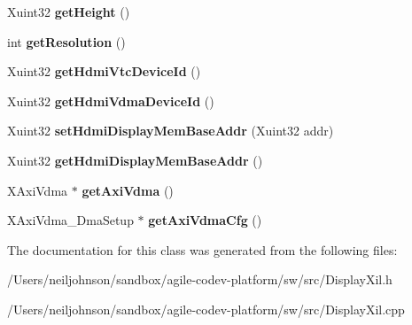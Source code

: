 \begin{DoxyCompactItemize}
\item 
\hypertarget{class_display_xil_affa3b96c0ab1cacc7be57894d23ee775}{Xuint32 {\bfseries get\+Height} ()}\label{class_display_xil_affa3b96c0ab1cacc7be57894d23ee775}

\item 
\hypertarget{class_display_xil_a2b2d3013803ffa0b2516b9e5def7080c}{int {\bfseries get\+Resolution} ()}\label{class_display_xil_a2b2d3013803ffa0b2516b9e5def7080c}

\item 
\hypertarget{class_display_xil_ac2e2d2e53c6845c94826d66609051e4e}{Xuint32 {\bfseries get\+Hdmi\+Vtc\+Device\+Id} ()}\label{class_display_xil_ac2e2d2e53c6845c94826d66609051e4e}

\item 
\hypertarget{class_display_xil_a91b8aeef0fdc4d6e14f431851fe4d7d6}{Xuint32 {\bfseries get\+Hdmi\+Vdma\+Device\+Id} ()}\label{class_display_xil_a91b8aeef0fdc4d6e14f431851fe4d7d6}

\item 
\hypertarget{class_display_xil_ab693f7986ccb1086fde71d2fb96922a7}{Xuint32 {\bfseries set\+Hdmi\+Display\+Mem\+Base\+Addr} (Xuint32 addr)}\label{class_display_xil_ab693f7986ccb1086fde71d2fb96922a7}

\item 
\hypertarget{class_display_xil_ab760adbb64268a15b5988e1b62c5f424}{Xuint32 {\bfseries get\+Hdmi\+Display\+Mem\+Base\+Addr} ()}\label{class_display_xil_ab760adbb64268a15b5988e1b62c5f424}

\item 
\hypertarget{class_display_xil_a82995915d86cd698ca4c88078391af4e}{X\+Axi\+Vdma $\ast$ {\bfseries get\+Axi\+Vdma} ()}\label{class_display_xil_a82995915d86cd698ca4c88078391af4e}

\item 
\hypertarget{class_display_xil_a0e3fe7495568f5c5d0c75af7a6f3ac3f}{X\+Axi\+Vdma\+\_\+\+Dma\+Setup $\ast$ {\bfseries get\+Axi\+Vdma\+Cfg} ()}\label{class_display_xil_a0e3fe7495568f5c5d0c75af7a6f3ac3f}

\end{DoxyCompactItemize}


The documentation for this class was generated from the following files\+:\begin{DoxyCompactItemize}
\item 
/\+Users/neiljohnson/sandbox/agile-\/codev-\/platform/sw/src/Display\+Xil.\+h\item 
/\+Users/neiljohnson/sandbox/agile-\/codev-\/platform/sw/src/Display\+Xil.\+cpp\end{DoxyCompactItemize}
